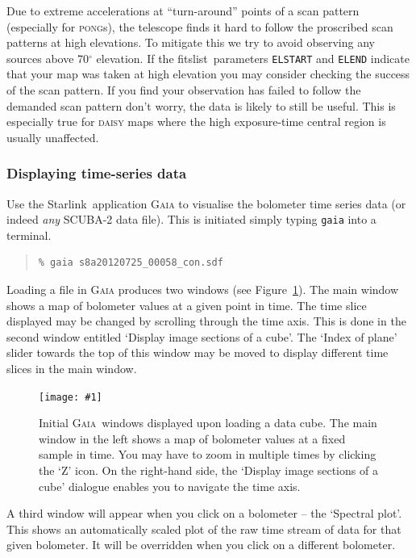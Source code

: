 \documentclass[twoside,11pt]{article}
\newcommand{\htmladdnormallink}[2]{#1}
\newcommand{\htmladdimg}[1]{}
\newcommand{\htmlref}[2]{#1}
\newcommand{\latexhtml}[2]{#1}
\newcommand{\xref}[3]{#1}
\newcommand{\xlabel}[1]{}
\renewcommand{\_}{\texttt{\symbol{95}}}
\newenvironment{myquote}{\begin{quote}\begin{small}}{\end{small}\end{quote}}
\newcommand{\starlink}{\htmladdnormallink{Starlink}{http://starlink.jach.hawaii.edu}}
\newcommand{\gaia}{\xref{\textsc{Gaia}}{sun214}{}}
\newcommand{\task}[1]{\textsf{#1}}
\newcommand{\param}[1]{\texttt{#1}}
\newcommand{\fitslist}{\xref{\task{fitslist}}{sun95}{FITSLIST}}
\newcommand{\myfig}[5]{
  \begin{figure}#2
    \centering\texttt{[image: \#1]}
    \typeout{#1.eps inserted on page \arabic{page}}
    \caption{\label{#4}\small #5}
  \end{figure}
}
\newcommand{\myfig}[5]{
    \label{#4} \htmladdimg{#1.png}\\
    \\
    Figure: #5\\
  }
\newcommand{\cref}[3]{\latexhtml{#1~\ref{#2}}{\htmlref{#3}{#2}}}
\begin{document}
Due to extreme accelerations at ``turn-around'' points of a scan
pattern (especially for \textsc{pong}s), the telescope finds it hard
to follow the proscribed scan patterns at high elevations. To mitigate
this we try to avoid observing any sources above 70$^\circ$ elevation.
If the \fitslist\ parameters \param{ELSTART} and \param{ELEND}
indicate that your map was taken at high elevation you may consider
checking the success of the scan pattern. If you find your observation
has failed to follow the demanded scan pattern don't worry, the data is
likely to still be useful. This is especially true for \textsc{daisy}
maps where the high exposure-time central region is usually
unaffected.

\subsubsection{\xlabel{display_cube}Displaying time-series data}
\label{sec:gaiacube}

Use the \starlink\ application \textsc{Gaia} to visualise the bolometer time
series data (or indeed \emph{any} SCUBA-2 data file). This is
initiated simply typing \texttt{gaia} into a terminal.

\begin{myquote}
\begin{verbatim}
% gaia s8a20120725_00058_con.sdf
\end{verbatim}
\end{myquote}

Loading a file in \textsc{Gaia} produces two windows (see
\cref{Figure}{fig:gaia_main}{upper graphic}). The main window shows a map of bolometer
values at a given point in time. The time slice displayed may be
changed by scrolling through the time axis. This is done in the second
window entitled `Display image sections of a cube'. The `Index of
plane' slider towards the top of this window may be moved to display
different time slices in the main window.

\myfig{sc21_gaia1}{[h!]}{width=\linewidth}{fig:gaia_main}{
  Initial \gaia\ windows displayed upon loading a data cube.
  The main window in the left shows a map of bolometer values at a fixed
  sample in time. You may have to zoom in multiple times by clicking the
  `Z' icon. On the right-hand side, the `Display image sections of a cube'
  dialogue enables you to navigate the time axis.}

A third window will appear when you click on a bolometer -- the
`Spectral plot'. This shows an automatically scaled plot of the raw
time stream of data for that given bolometer. It will be overridden
when you click on a different bolometer.
\end{document}
